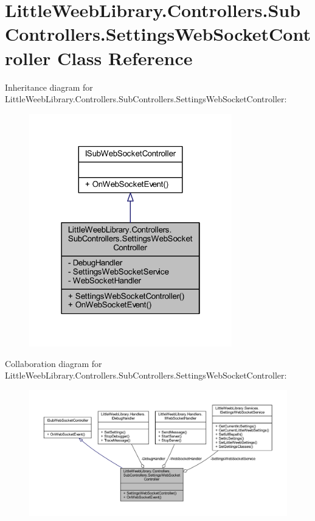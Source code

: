\hypertarget{class_little_weeb_library_1_1_controllers_1_1_sub_controllers_1_1_settings_web_socket_controller}{}\section{Little\+Weeb\+Library.\+Controllers.\+Sub\+Controllers.\+Settings\+Web\+Socket\+Controller Class Reference}
\label{class_little_weeb_library_1_1_controllers_1_1_sub_controllers_1_1_settings_web_socket_controller}


Inheritance diagram for Little\+Weeb\+Library.\+Controllers.\+Sub\+Controllers.\+Settings\+Web\+Socket\+Controller\+:\nopagebreak
\begin{figure}[H]
\begin{center}
\leavevmode
\includegraphics[width=250pt]{class_little_weeb_library_1_1_controllers_1_1_sub_controllers_1_1_settings_web_socket_controller__inherit__graph}
\end{center}
\end{figure}


Collaboration diagram for Little\+Weeb\+Library.\+Controllers.\+Sub\+Controllers.\+Settings\+Web\+Socket\+Controller\+:\nopagebreak
\begin{figure}[H]
\begin{center}
\leavevmode
\includegraphics[width=350pt]{class_little_weeb_library_1_1_controllers_1_1_sub_controllers_1_1_settings_web_socket_controller__coll__graph}
\end{center}
\end{figure}
